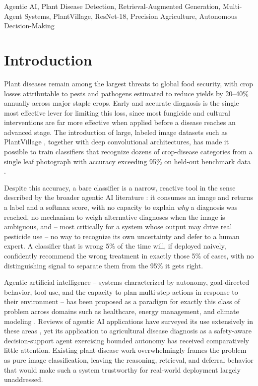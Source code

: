 \documentclass[conference]{IEEEtran}
\begin{document}
\begin{IEEEkeywords}
Agentic AI, Plant Disease Detection, Retrieval-Augmented Generation, Multi-Agent Systems, PlantVillage, ResNet-18, Precision Agriculture, Autonomous Decision-Making
\end{IEEEkeywords}

\section{Introduction}
\label{sec:intro}

Plant diseases remain among the largest threats to global food security, with crop losses attributable to pests and pathogens estimated to reduce yields by 20--40\% annually across major staple crops. Early and accurate diagnosis is the single most effective lever for limiting this loss, since most fungicide and cultural interventions are far more effective when applied before a disease reaches an advanced stage. The introduction of large, labeled image datasets such as PlantVillage \cite{r_hughes2015}, together with deep convolutional architectures, has made it possible to train classifiers that recognize dozens of crop-disease categories from a single leaf photograph with accuracy exceeding 95\% on held-out benchmark data \cite{r_mohanty2016}.

Despite this accuracy, a bare classifier is a narrow, reactive tool in the sense described by the broader agentic AI literature \cite{b1,b9}: it consumes an image and returns a label and a softmax score, with no capacity to explain \emph{why} a diagnosis was reached, no mechanism to weigh alternative diagnoses when the image is ambiguous, and -- most critically for a system whose output may drive real pesticide use -- no way to recognize its own uncertainty and defer to a human expert. A classifier that is wrong 5\% of the time will, if deployed naively, confidently recommend the wrong treatment in exactly those 5\% of cases, with no distinguishing signal to separate them from the 95\% it gets right.

Agentic artificial intelligence -- systems characterized by autonomy, goal-directed behavior, tool use, and the capacity to plan multi-step actions in response to their environment -- has been proposed as a paradigm for exactly this class of problem across domains such as healthcare, energy management, and climate modeling \cite{b1,b3,b6,b13,b14}. Reviews of agentic AI applications have surveyed its use extensively in these areas \cite{b2,b5,b10}, yet its application to agricultural disease diagnosis as a safety-aware decision-support agent exercising bounded autonomy has received comparatively little attention. Existing plant-disease work overwhelmingly frames the problem as pure image classification, leaving the reasoning, retrieval, and deferral behavior that would make such a system trustworthy for real-world deployment largely unaddressed.
\end{document}
